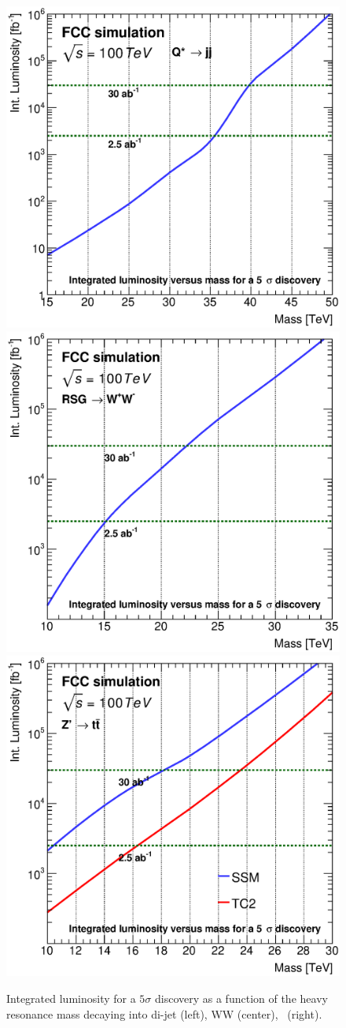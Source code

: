 \documentclass{cernrep}
\begin{document}
\begin{figure}[!htb]
  \centering
  \includegraphics[width=0.30\columnwidth]{Fig/DiscoveryPotential_jj_rootStyle.eps}
  \includegraphics[width=0.30\columnwidth]{Fig/DiscoveryPotential_ww_tagger_rootStyle.eps}
  \includegraphics[width=0.30\columnwidth]{Fig/DiscoveryPotential_tt_SSM_TC2_tagger_TRFbtag_rootStyle.eps}
  \caption{Integrated luminosity for a $5\sigma$ discovery as a function of the heavy resonance mass decaying into di-jet (left), WW (center), \ttbar\ (right).}
  \label{figure:hadronicresonances:resultsjj}
\end{figure}

\clearpage
\newpage

\end{document}
